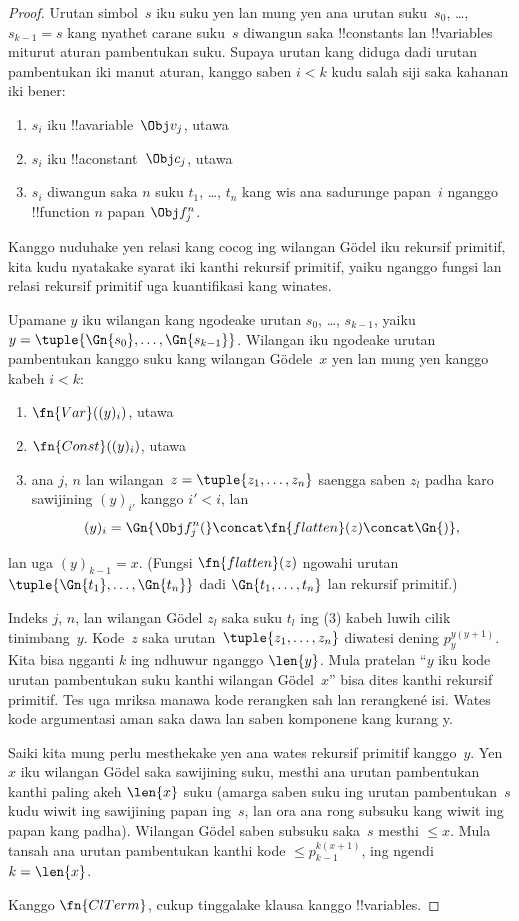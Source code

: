 \documentclass[../../../include/open-logic-section]{subfiles}
\begin{document}
\begin{proof}
Urutan simbol~$s$ iku suku yen lan mung yen
ana urutan suku~$s_0$, \dots,
$s_{k-1} = s$ kang nyathet carane suku~$s$
diwangun saka !!{constant}s lan !!{variable}s
miturut aturan pambentukan suku. Supaya urutan
kang diduga dadi urutan pambentukan iki
manut aturan, kanggo saben $i < k$ kudu
salah siji saka kahanan iki bener:
\begin{enumerate}
\item $s_i$ iku !!a{variable}~$\Obj v_j$, utawa
\item $s_i$ iku !!a{constant}~$\Obj c_j$, utawa
\item $s_i$ diwangun saka $n$ suku $t_1$,
  \dots, $t_n$ kang wis ana sadurunge
  papan~$i$ nganggo !!{function} $n$ papan
  $\Obj f^n_j$.
\end{enumerate}
Kanggo nuduhake yen relasi kang cocog ing
wilangan G\"odel iku rekursif primitif,
kita kudu nyatakake syarat iki kanthi
rekursif primitif, yaiku nganggo fungsi
lan relasi rekursif primitif uga
kuantifikasi kang winates.

Upamane $y$ iku wilangan kang ngodeake
urutan $s_0$, \dots, $s_{k-1}$,
yaiku $y = \tuple{\Gn{s_0}, \dots, \Gn{s_{k-1}}}$.
Wilangan iku ngodeake urutan pambentukan
kanggo suku kang wilangan G\"odele~$x$
yen lan mung yen kanggo kabeh $i < k$:
\begin{enumerate}
\item $\fn{Var}((y)_i)$, utawa
\item $\fn{Const}((y)_i)$, utawa
\item ana $j$, $n$ lan wilangan~$z = \tuple{z_1, \dots, z_n}$
  saengga saben $z_l$ padha karo sawijining
  $(y)_{i'}$ kanggo $i' < i$, lan
\[
(y)_i = \Gn{\Obj f^n_j(} \concat \fn{flatten}(z) \concat \Gn{)},
\]
\end{enumerate}
lan uga $(y)_{k-1} = x$. (Fungsi
$\fn{flatten}(z)$ ngowahi urutan
$\tuple{\Gn{t_1}, \dots, \Gn{t_n}}$ dadi
$\Gn{t_1, \dots, t_n}$ lan rekursif primitif.)

Indeks $j$, $n$, lan wilangan G\"odel $z_l$ saka suku $t_l$
ing (3) kabeh luwih cilik tinimbang~$y$. Kode~$z$ saka
urutan~$\tuple{z_1, \dots, z_n}$ diwatesi dening
$p_y^{y(y+1)}$. Kita bisa ngganti $k$ ing ndhuwur nganggo
$\len{y}$. Mula pratelan ``$y$ iku kode urutan pambentukan suku
kanthi wilangan G\"odel~$x$'' bisa dites kanthi rekursif primitif.
Tes uga mriksa manawa kode rerangken sah lan rerangkené isi.
Wates kode argumentasi aman saka dawa lan saben komponene kang kurang y.

Saiki kita mung perlu mesthekake yen ana
wates rekursif primitif kanggo~$y$.
Yen $x$ iku wilangan G\"odel saka sawijining
suku, mesthi ana urutan pambentukan kanthi
paling akeh $\len{x}$ suku (amarga saben
suku ing urutan pambentukan~$s$ kudu
wiwit ing sawijining papan ing~$s$,
lan ora ana rong subsuku kang wiwit ing
papan kang padha). Wilangan G\"odel saben
subsuku saka~$s$ mesthi $\le x$.
Mula tansah ana urutan pambentukan
kanthi kode $\le p_{k-1}^{k(x+1)}$,
ing ngendi $k=\len{x}$.

Kanggo $\fn{ClTerm}$, cukup tinggalake
klausa kanggo !!{variable}s.
\end{proof}
\end{document}
